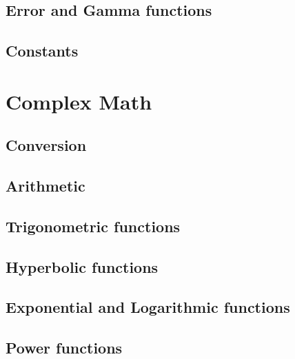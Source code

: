 \subsection{Error and Gamma functions}
\label{section:fpm:math:error-gamma}

\subsection{Constants}
\label{section:fpm:math:constants}

% 
%
\section{Complex Math}
\label{section:fpm:math-complex}

\subsection{Conversion}
\label{section:fpm:math-complex:conversion}

\subsection{Arithmetic}
\label{section:fpm:math-complex:arithmetic}

\subsection{Trigonometric functions}
\label{section:fpm:math-complex:trig}

\subsection{Hyperbolic functions}
\label{section:fpm:math-complex:hyperbolic}

\subsection{Exponential and Logarithmic functions}
\label{section:fpm:math-complex:explog}

\subsection{Power functions}
\label{section:fpm:math-complex:power}


